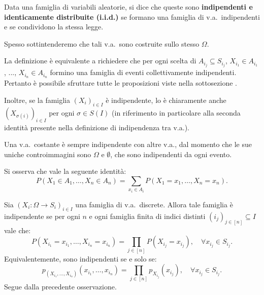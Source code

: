 \begin{multicols*}{2}
\begin{definition}
    Data una famiglia di variabili aleatorie, si dice che
    queste sono \textbf{indipendenti e identicamente distribuite (i.i.d.)}
    se formano una famiglia di v.a.~indipendenti e se condividono
    la stessa legge. \smallskip

    Spesso sottintenderemo che tali v.a.~sono costruite sullo stesso $\Omega$.
\end{definition}

\begin{remark}
    La definizione è equivalente a richiedere che per ogni scelta di $A_{i_j} \subseteq S_{i_j}$,
    $X_{i_1} \in A_{i_1}$, ..., $X_{i_n} \in A_{i_n}$ formino una famiglia di eventi
    collettivamente indipendenti. Pertanto è possibile sfruttare tutte
    le proposizioni viste nella sottosezione \textit{}. \smallskip

    Inoltre, se la famiglia $(X_i)_{i \in I}$ è indipendente, lo è
    chiaramente anche $(X_{\sigma(i)})_{i \in I}$ per ogni $\sigma \in S(I)$
    (in riferimento in particolare alla seconda identità presente nella definizione
    di indipendenza tra v.a.).
\end{remark}

\begin{remark}
    Una v.a.~costante è sempre indipendente con altre v.a., dal momento che
    le sue uniche controimmagini sono $\Omega$ e $\emptyset$, che sono indipendenti
    da ogni evento.
\end{remark}

\begin{remark}
    Si osserva che vale la seguente identità:
    \[
        P(X_1 \in A_1, \ldots, X_n \in A_n) = \sum_{x_i \in A_i} P(X_1 = x_1, \ldots, X_n = x_n).
    \]
\end{remark}

\begin{proposition}
    Sia $(X_i : \Omega \to S_i)_{i \in I}$ una famiglia di v.a.~discrete. Allora
    tale famiglia è indipendente se per ogni $n$ e ogni famiglia finita di
    indici distinti $(i_j)_{j \in [n]} \subseteq I$ vale che:
    \[
        P(X_{i_1} = x_{i_1}, \ldots, X_{i_n} = x_{i_n}) = \prod_{j \in [n]} P(X_{i_j} = x_{i_j}), \quad \forall x_{i_j} \in S_{i_j}.
    \]
    Equivalentemente, sono indipendenti se e solo se:
    \[
        p_{(X_{i_1}, \ldots, X_{i_n})}(x_{i_1}, \ldots, x_{i_n}) = \prod_{j \in [n]} p_{X_{i_j}}(x_{i_j}), \quad \forall x_{i_j} \in S_{i_j}.
    \]
    Segue dalla precedente osservazione.
\end{proposition}


\end{multicols*}
